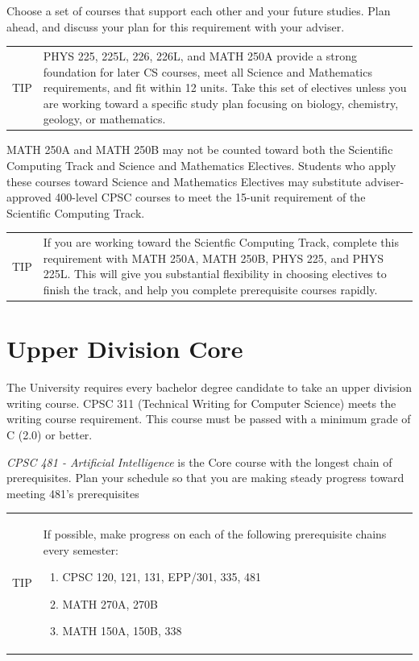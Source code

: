 \documentclass{book}
\newenvironment{tip}
               {\tcolorbox \begin{tabular}{m{.5in} m{5in}} \Large{TIP} & }
               {\end{tabular} \endtcolorbox}
\begin{document}
Choose a set of courses that support each other and your future studies. Plan ahead, and discuss your plan for this requirement with your adviser.

\begin{tip}
PHYS 225, 225L, 226, 226L, and MATH 250A provide a strong foundation for later CS courses, meet all Science and Mathematics requirements, and fit within 12 units. Take this set of electives unless you are working toward a specific study plan focusing on biology, chemistry, geology, or mathematics.
\end{tip}

MATH 250A and MATH 250B may not be counted toward both the Scientific Computing Track  and Science and Mathematics Electives. Students who apply these courses toward Science and Mathematics Electives may substitute adviser-approved 400-level CPSC courses to meet the 15-unit requirement of the Scientific Computing Track.

\begin{tip}
If you are working toward the Scientfic Computing Track, complete this requirement with  MATH 250A, MATH 250B, PHYS 225, and PHYS 225L. This will give you substantial flexibility in choosing electives to finish the track, and help you complete prerequisite courses rapidly.
\end{tip}

\section{Upper Division Core}

The University requires every bachelor degree candidate to take an upper division writing course. CPSC 311 (Technical Writing for Computer Science) meets the writing course requirement. This course must be passed with a minimum grade of C (2.0) or better.

\emph{CPSC 481 - Artificial Intelligence} is the Core course with the longest chain of prerequisites. Plan your schedule so that you are making steady progress toward meeting 481's prerequisites

\begin{tip}
  If possible, make progress on each of the following prerequisite chains every semester:
  \begin{enumerate}
  \item CPSC 120, 121, 131, EPP/301, 335, 481
  \item MATH 270A, 270B
  \item MATH 150A, 150B, 338
  \end{enumerate}
\end{tip}
\end{document}
